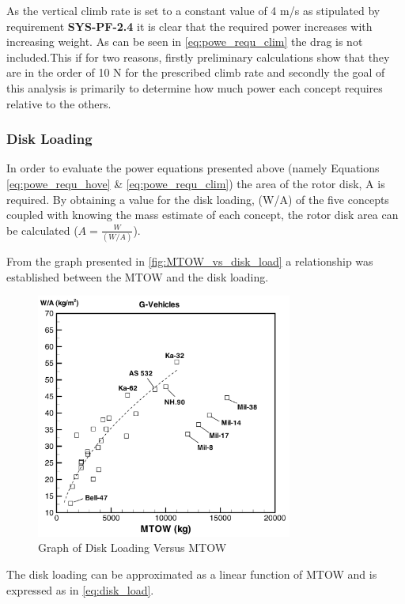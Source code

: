 As the vertical climb rate is set to a constant value of 4 m/s as stipulated by requirement \textbf{SYS-PF-2.4} it is clear that the required power increases with increasing weight. As can be seen in \autoref{eq:powe_requ_clim} the drag is not included.This if for two reasons, firstly preliminary calculations show that they are in the order of 10 N for the prescribed climb rate and secondly the goal of this analysis is primarily to determine how much power each concept requires relative to the others.

\subsubsection{Disk Loading}

In order to evaluate the power equations presented above (namely Equations \ref{eq:powe_requ_hove} \& \ref{eq:powe_requ_clim}) the area of the rotor disk, A is required. By obtaining a value for the disk loading, (W/A) of the five concepts coupled with knowing the mass estimate of each concept, the rotor disk area can be calculated ($A = \frac{W}{(W/A)}$).

From the graph presented in \autoref{fig:MTOW_vs_disk_load} a relationship was established between the MTOW and the disk loading.

\begin{figure}[H]
\centering
\includegraphics[width=0.75\textwidth]{PerformanceAnalysis/Figures/DiskLoading_vs_MTOW.png}
\caption{Graph of Disk Loading Versus MTOW \cite{diskloading}}
\label{fig:MTOW_vs_disk_load}
\end{figure}

The disk loading can be approximated as a linear function of MTOW and is expressed as in \autoref{eq:disk_load}. 

